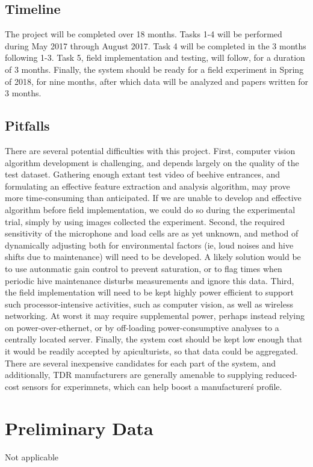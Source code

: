 \subsection{Timeline}

The project will be completed over 18 months. Tasks 1-4 will be performed during May 2017 through August 2017. Task 4 will be completed in the 3 months following 1-3. Task 5, field implementation and testing, will follow, for a duration of 3 months. Finally, the system should be ready for a field experiment in Spring of 2018, for nine months, after which data will be analyzed and papers written for 3 months.

\subsection{Pitfalls}

There are several potential difficulties with this project. First, computer vision algorithm development is challenging, and depends largely on the quality of the test dataset. Gathering enough extant test video of beehive entrances, and formulating an effective feature extraction and analysis algorithm, may prove more time-consuming than anticipated. If we are unable to develop and effective algorithm before field implementation, we could do so during the experimental trial, simply by using images collected the experiment. Second, the required sensitivity of the microphone and load cells are as yet unknown, and method of dynamically adjusting both for environmental factors (ie, loud noises and hive shifts due to maintenance) will need to be developed. A likely solution would be to use autonmatic gain control to prevent saturation, or to flag times when periodic hive maintenance disturbs measurements and ignore this data. Third, the field implementation will need to be kept highly power efficient to support such processor-intensive activities, such as computer vision, as well as wireless networking. At worst it may require  supplemental power, perhaps instead relying on power-over-ethernet, or by off-loading power-consumptive analyses to a centrally located server. Finally, the system cost should be kept low enough that it would be readily accepted by apiculturists, so that data could be aggregated. There are several inexpensive candidates for each part of the system, and additionally, TDR manufacturers are generally amenable to supplying reduced-cost sensors for experimnets, which can help boost a manufacturer\'s profile.

\section{Preliminary Data}

Not applicable
